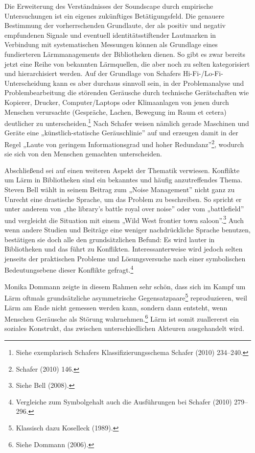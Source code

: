\documentclass[a4paper,
fontsize=11pt,
oneside,
numbers=noperiodatend,
parskip=half-,
bibliography=totoc,
final
]{scrartcl}
\begin{document}
Die Erweiterung des Verständnisses der Soundscape durch empirische
Untersuchungen ist ein eigenes zukünftiges Betätigungsfeld. Die genauere
Bestimmung der vorherrschenden Grundlaute, der als positiv und negativ
empfundenen Signale und eventuell identitätsstiftender Lautmarken in
Verbindung mit systematischen Messungen können als Grundlage eines
fundierteren Lärmmanagements der Bibliotheken dienen. So gibt es zwar
bereits jetzt eine Reihe von bekannten Lärmquellen, die aber noch zu
selten kategorisiert und hierarchisiert werden. Auf der Grundlage von
Schafers Hi-Fi-/Lo-Fi-Unterscheidung kann es aber durchaus sinnvoll
sein, in der Problemanalyse und Problembearbeitung die störenden
Geräusche durch technische Gerätschaften wie Kopierer, Drucker,
Computer/Laptops oder Klimaanlagen von jenen durch Menschen verursachte
(Gespräche, Lachen, Bewegung im Raum et cetera) deutlicher zu
unterscheiden.\footnote{Siehe exemplarisch Schafers
  Klassifizierungsschema Schafer (2010) 234--240.} Nach Schafer weisen
nämlich gerade Maschinen und Geräte eine „künstlich-statische
Geräuschlinie'' auf und erzeugen damit in der Regel „Laute von geringem
Informationsgrad und hoher Redundanz''\footnote{Schafer (2010) 146.},
wodurch sie sich von den Menschen gemachten unterscheiden.

Abschließend sei auf einen weiteren Aspekt der Thematik verwiesen.
Konflikte um Lärm in Bibliotheken sind ein bekanntes und häufig
anzutreffendes Thema. Steven Bell wählt in seinem Beitrag zum „Noise
Management'' nicht ganz zu Unrecht eine drastische Sprache, um das
Problem zu beschreiben. So spricht er unter anderem von „the library's
battle royal over noise'' oder vom „battlefield'' und vergleicht die
Situation mit einem „Wild West frontier town saloon''.\footnote{Siehe
  Bell (2008).} Auch wenn andere Studien und Beiträge eine weniger
nachdrückliche Sprache benutzen, bestätigen sie doch alle den
grundsätzlichen Befund: Es wird lauter in Bibliotheken und das führt zu
Konflikten. Interessanterweise wird jedoch selten jenseits der
praktischen Probleme und Lösungsversuche nach einer symbolischen
Bedeutungsebene dieser Konflikte gefragt.\footnote{Vergleiche zum
  Symbolgehalt auch die Ausführungen bei Schafer (2010) 279--296.}

Monika Dommann zeigte in diesem Rahmen sehr schön, dass sich im Kampf um
Lärm oftmals grundsätzliche asymmetrische Gegensatzpaare\footnote{Klassisch
  dazu Koselleck (1989).} reproduzieren, weil Lärm am Ende nicht
gemessen werden kann, sondern dann entsteht, wenn Menschen Geräusche als
Störung wahrnehmen.\footnote{Siehe Dommann (2006).} Lärm ist somit
zuallererst ein soziales Konstrukt, das zwischen unterschiedlichen
Akteuren ausgehandelt wird.
\end{document}
